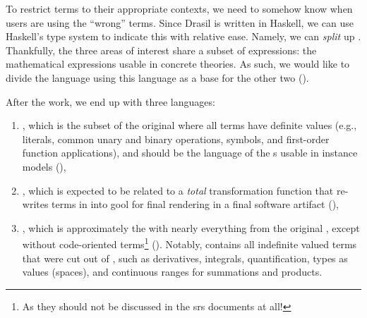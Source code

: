 To restrict terms to their appropriate contexts, we need to somehow know when
users are using the ``wrong'' terms. Since Drasil is written in Haskell, we can
use Haskell's type system to indicate this with relative ease. Namely, we can
\textit{split} up \Expr{}. Thankfully, the three areas of interest share a
subset of expressions: the mathematical expressions usable in concrete theories.
As such, we would like to divide the language using this language as a base for
the other two ().

\languageDivision{}

After the work, we end up with three languages:

\begin{enumerate}

    \item \Expr{}, which is the subset of the original \Expr{} where all terms
          have definite values (e.g., literals, common unary and binary
          operations, symbols, and first-order function applications), and
          should be the language of the \QDefinition{}s usable in instance
          models (),
    
    \item \CodeExpr{}, which is expected to be related to a \textit{total}
          transformation function that re-writes terms in \CodeExpr{} into
          \acs{gool} for final rendering in a final software artifact
          (),

    \item  \ModelExpr{}, which is approximately the \Expr{} with nearly
          everything from the original \Expr{}, except without code-oriented
          terms\footnote{As they should not be discussed in the \acs{srs}
          documents at all!} (). Notably,
          \ModelExpr{} contains all indefinite valued terms that were cut out of
          \Expr{}, such as derivatives, integrals, quantification, types as
          values (spaces), and continuous ranges for summations and products.

\end{enumerate}

